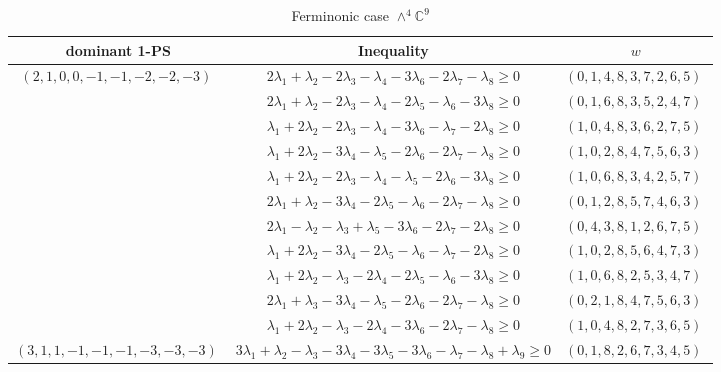 \documentclass[12pt]{article}
\begin{document}
 
 \begin{center} 
  \end{center} 
 \begin{longtable}[l]{|c|c|c|} 
 \caption{Ferminonic case $\wedge^{4}\mathbb{C}^{9}$} \\  
 
 \hline 
 \textrm{dominant 1-PS} & \textrm{Inequality} & $w$ \\ 
 \hline\multirow{11}{*}{ $(2 ,1 ,0 ,0 ,-1 ,-1 ,-2 ,-2 ,-3) \;$ }  & $2\lambda_{1} + \lambda_{2}-2\lambda_{3}-\lambda_{4}-3\lambda_{6}-2\lambda_{7}-\lambda_{8}\geq 0$ & $(0 ,1 ,4 ,8 ,3 ,7 ,2 ,6 ,5) \;$\\ 
 \cline{2-3} 
 & $2\lambda_{1} + \lambda_{2}-2\lambda_{3}-\lambda_{4}-2\lambda_{5}-\lambda_{6}-3\lambda_{8}\geq 0$ & $(0 ,1 ,6 ,8 ,3 ,5 ,2 ,4 ,7) \;$\\ 
 \cline{2-3} 
 & $\lambda_{1} + 2\lambda_{2}-2\lambda_{3}-\lambda_{4}-3\lambda_{6}-\lambda_{7}-2\lambda_{8}\geq 0$ & $(1 ,0 ,4 ,8 ,3 ,6 ,2 ,7 ,5) \;$\\ 
 \cline{2-3} 
 & $\lambda_{1} + 2\lambda_{2}-3\lambda_{4}-\lambda_{5}-2\lambda_{6}-2\lambda_{7}-\lambda_{8}\geq 0$ & $(1 ,0 ,2 ,8 ,4 ,7 ,5 ,6 ,3) \;$\\ 
 \cline{2-3} 
 & $\lambda_{1} + 2\lambda_{2}-2\lambda_{3}-\lambda_{4}-\lambda_{5}-2\lambda_{6}-3\lambda_{8}\geq 0$ & $(1 ,0 ,6 ,8 ,3 ,4 ,2 ,5 ,7) \;$\\ 
 \cline{2-3} 
 & $2\lambda_{1} + \lambda_{2}-3\lambda_{4}-2\lambda_{5}-\lambda_{6}-2\lambda_{7}-\lambda_{8}\geq 0$ & $(0 ,1 ,2 ,8 ,5 ,7 ,4 ,6 ,3) \;$\\ 
 \cline{2-3} 
 & $2\lambda_{1}-\lambda_{2}-\lambda_{3} + \lambda_{5}-3\lambda_{6}-2\lambda_{7}-2\lambda_{8}\geq 0$ & $(0 ,4 ,3 ,8 ,1 ,2 ,6 ,7 ,5) \;$\\ 
 \cline{2-3} 
 & $\lambda_{1} + 2\lambda_{2}-3\lambda_{4}-2\lambda_{5}-\lambda_{6}-\lambda_{7}-2\lambda_{8}\geq 0$ & $(1 ,0 ,2 ,8 ,5 ,6 ,4 ,7 ,3) \;$\\ 
 \cline{2-3} 
 & $\lambda_{1} + 2\lambda_{2}-\lambda_{3}-2\lambda_{4}-2\lambda_{5}-\lambda_{6}-3\lambda_{8}\geq 0$ & $(1 ,0 ,6 ,8 ,2 ,5 ,3 ,4 ,7) \;$\\ 
 \cline{2-3} 
 & $2\lambda_{1} + \lambda_{3}-3\lambda_{4}-\lambda_{5}-2\lambda_{6}-2\lambda_{7}-\lambda_{8}\geq 0$ & $(0 ,2 ,1 ,8 ,4 ,7 ,5 ,6 ,3) \;$\\ 
 \cline{2-3} 
 & $\lambda_{1} + 2\lambda_{2}-\lambda_{3}-2\lambda_{4}-3\lambda_{6}-2\lambda_{7}-\lambda_{8}\geq 0$ & $(1 ,0 ,4 ,8 ,2 ,7 ,3 ,6 ,5) \;$\\ \hline\multirow{2}{*}{ $(3 ,1 ,1 ,-1 ,-1 ,-1 ,-3 ,-3 ,-3) \;$ }  & $3\lambda_{1} + \lambda_{2}-\lambda_{3}-3\lambda_{4}-3\lambda_{5}-3\lambda_{6}-\lambda_{7}-\lambda_{8} + \lambda_{9}\geq 0$ & $(0 ,1 ,8 ,2 ,6 ,7 ,3 ,4 ,5) \;$\\ 

\end{longtable}
\end{document}
